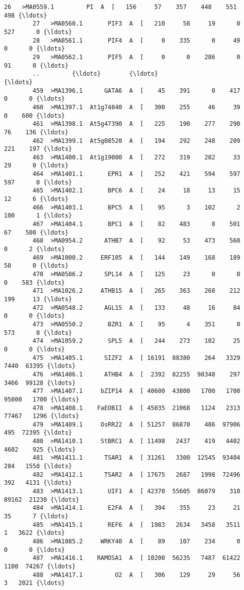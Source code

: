 \documentclass[11pt]{article}
\begin{document}
\begin{Verbatim}[commandchars=\\\{\}]
        26   >MA0559.1         PI  A  [   156     57    357    448    551    498 {\ldots}   
        27   >MA0560.1       PIF3  A  [   210     58     19      0    527      0 {\ldots}   
        28   >MA0561.1       PIF4  A  [     0    335      0     49      0      0 {\ldots}   
        29   >MA0562.1       PIF5  A  [     0      0    286      0     91      0 {\ldots}   
        ..         {\ldots}        {\ldots}                                                {\ldots}   
        459  >MA1396.1      GATA6  A  [    45    391      0    417      0      0 {\ldots}   
        460  >MA1397.1  At1g74840  A  [   300    255     46     39      0    600 {\ldots}   
        461  >MA1398.1  At5g47390  A  [   225    190    277    290     76    136 {\ldots}   
        462  >MA1399.1  At5g08520  A  [   194    292    248    209    221    197 {\ldots}   
        463  >MA1400.1  At1g19000  A  [   272    319    282     33     29      0 {\ldots}   
        464  >MA1401.1       EPR1  A  [   252    421    594    597    597      0 {\ldots}   
        465  >MA1402.1       BPC6  A  [    24     18     13     15     12      6 {\ldots}   
        466  >MA1403.1       BPC5  A  [    95      3    102      2    100      1 {\ldots}   
        467  >MA1404.1       BPC1  A  [    82    483      8    501     67    500 {\ldots}   
        468  >MA0954.2      ATHB7  A  [    92     53    473    560      0      2 {\ldots}   
        469  >MA1000.2     ERF105  A  [   144    149    168    189     50      0 {\ldots}   
        470  >MA0586.2      SPL14  A  [   125     23      0      0      0    583 {\ldots}   
        471  >MA1026.2     ATHB15  A  [   265    363    268    212    199     13 {\ldots}   
        472  >MA0548.2      AGL15  A  [   133     48     16     84      0      0 {\ldots}   
        473  >MA0550.2       BZR1  A  [    95      4    351      0    573      0 {\ldots}   
        474  >MA1059.2       SPL5  A  [   244    273    102     25      0      0 {\ldots}   
        475  >MA1405.1      SIZF2  A  [ 16191  88380    264   3329   7440  63395 {\ldots}   
        476  >MA1406.1      ATHB4  A  [  2392  82255  98348    297   3466  99128 {\ldots}   
        477  >MA1407.1     bZIP14  A  [ 40600  43800   1700   1700  95000   1700 {\ldots}   
        478  >MA1408.1    FaEOBII  A  [ 45035  21068   1124   2313  77467   1296 {\ldots}   
        479  >MA1409.1     OsRR22  A  [ 51257  86870    486  97906    495  72395 {\ldots}   
        480  >MA1410.1     StBRC1  A  [ 11498   2437    419   4402   4602    925 {\ldots}   
        481  >MA1411.1      TSAR1  A  [ 31261   3300  12545  93404    284   1558 {\ldots}   
        482  >MA1412.1      TSAR2  A  [ 17675   2687   1998  72496    392   4131 {\ldots}   
        483  >MA1413.1       UIF1  A  [ 42370  55605  86079    310  89162  21230 {\ldots}   
        484  >MA1414.1       E2FA  A  [   394    355     23     21     35      7 {\ldots}   
        485  >MA1415.1       REF6  A  [  1983   2634   3458   3511      1   3622 {\ldots}   
        486  >MA1085.2     WRKY40  A  [    89    107    234      0      0      0 {\ldots}   
        487  >MA1416.1    RAMOSA1  A  [ 10200  56235   7487  61422   1100  74267 {\ldots}   
        488  >MA1417.1         O2  A  [   306    129     29     56      3   2021 {\ldots}   
        

\end{Verbatim}
\end{document}
